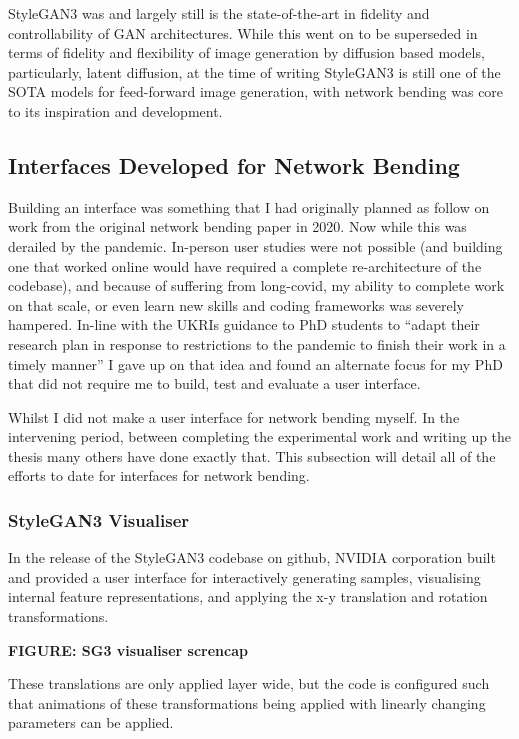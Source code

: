 StyleGAN3 was and largely still is the state-of-the-art in fidelity and controllability of GAN architectures. 
While this went on to be superseded in terms of fidelity and flexibility of image generation by diffusion based models, particularly, latent diffusion, at the time of writing StyleGAN3 is still one of the SOTA models for feed-forward image generation, with network bending was core to its inspiration and development. 

\subsection{Interfaces Developed for Network Bending}

Building an interface was something that I had originally planned as follow on work from the original network bending paper in 2020. 
Now while this was derailed by the pandemic. In-person user studies were not possible (and building one that worked online would have required a complete re-architecture of the codebase), and because of suffering from long-covid, my ability to complete work on that scale, or even learn new skills and coding frameworks was severely hampered. 
In-line with the UKRIs guidance to PhD students to “adapt their research plan in response to restrictions to the pandemic to finish their work in a timely manner” I gave up on that idea and found an alternate focus for my PhD that did not require me to build, test and evaluate a user interface. 

Whilst I did not make a user interface for network bending myself. 
In the intervening period, between completing the experimental work and writing up the thesis many others have done exactly that. 
This subsection will detail all of the efforts to date for interfaces for network bending.

\subsubsection{StyleGAN3 Visualiser}

In the release of the StyleGAN3 codebase on github, NVIDIA corporation built and provided a user interface for interactively generating samples, visualising internal feature representations, and applying the x-y translation and rotation transformations. 

\textbf{FIGURE: SG3 visualiser screncap}


These translations are only applied layer wide, but the code is configured such that animations of these transformations being applied with linearly changing parameters can be applied. 


